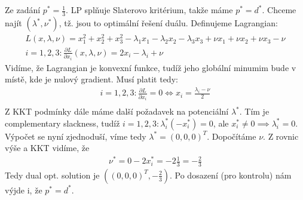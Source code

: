 \documentclass[12pt, a4paper]{article}
\begin{document}
\section{}
Ze zadání $p^* = \frac{1}{3}$. LP splňuje Slaterovo kritérium, takže máme  $p^*=d^*$. Chceme najít $(\lambda^*,\nu^*)$, tž. jsou to optimální řešení duálu. Definujeme Lagrangian:
\begin{gather*}
L(x,\lambda,\nu) = x_1^2+x_2^2+x_3^2-\lambda_1x_1-\lambda_2x_2-\lambda_3x_3+\nu x_1 + \nu x_2 + \nu x_3 - \nu\\
i = 1,2,3: \frac{\partial L}{\partial x_i} (x,\lambda,\nu)=2x_i-\lambda_i+\nu
\end{gather*}
Vidíme, že Lagrangian je konvexní funkce, tudíž jeho globální minumim bude v místě, kde je nulový gradient. Musí platit tedy: 
\begin{gather*}
i = 1,2,3: \frac{\partial L}{\partial x_i} = 0 \iff x_i = \frac{\lambda_i - \nu}{2}\\
\end{gather*}
Z KKT podmínky dále máme další požadavek na potenciální $\lambda^*$. Tím je complementary slackness, tudíž $i=1,2,3: \lambda_i^* (-x_i^*) = 0$, ale $x_i^* \neq 0 \implies \lambda_i^* = 0$. Výpočet se nyní zjednoduší, víme tedy $\lambda^* = (0,0,0)^T$. Dopočítáme $\nu$. Z rovnic výše a KKT vidíme, že 
\begin{gather*}
\nu^* = 0-2x_i^*= -2\frac{1}{3}=-\frac{2}{3}
\end{gather*}
Tedy dual opt. solution je $((0,0,0)^T, -\frac{2}{3})$. Po dosazení (pro kontrolu) nám výjde i, že $p^* = d^*$.
\section{}
\section{}
\end{document}
